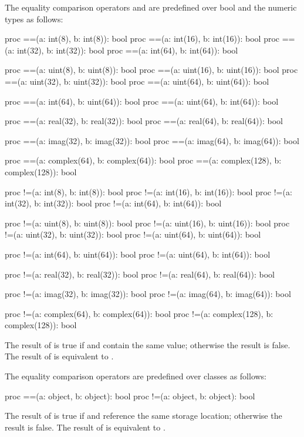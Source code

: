 The equality comparison operators \chpl{==} and \chpl{\!=} are predefined over bool and the
numeric types as follows:
\begin{chapel}
proc ==(a: int(8), b: int(8)): bool
proc ==(a: int(16), b: int(16)): bool
proc ==(a: int(32), b: int(32)): bool
proc ==(a: int(64), b: int(64)): bool

proc ==(a: uint(8), b: uint(8)): bool
proc ==(a: uint(16), b: uint(16)): bool
proc ==(a: uint(32), b: uint(32)): bool
proc ==(a: uint(64), b: uint(64)): bool

proc ==(a: int(64), b: uint(64)): bool
proc ==(a: uint(64), b: int(64)): bool

proc ==(a: real(32), b: real(32)): bool
proc ==(a: real(64), b: real(64)): bool

proc ==(a: imag(32), b: imag(32)): bool
proc ==(a: imag(64), b: imag(64)): bool

proc ==(a: complex(64), b: complex(64)): bool
proc ==(a: complex(128), b: complex(128)): bool

proc !=(a: int(8), b: int(8)): bool
proc !=(a: int(16), b: int(16)): bool
proc !=(a: int(32), b: int(32)): bool
proc !=(a: int(64), b: int(64)): bool

proc !=(a: uint(8), b: uint(8)): bool
proc !=(a: uint(16), b: uint(16)): bool
proc !=(a: uint(32), b: uint(32)): bool
proc !=(a: uint(64), b: uint(64)): bool

proc !=(a: int(64), b: uint(64)): bool
proc !=(a: uint(64), b: int(64)): bool

proc !=(a: real(32), b: real(32)): bool
proc !=(a: real(64), b: real(64)): bool

proc !=(a: imag(32), b: imag(32)): bool
proc !=(a: imag(64), b: imag(64)): bool

proc !=(a: complex(64), b: complex(64)): bool
proc !=(a: complex(128), b: complex(128)): bool
\end{chapel}
The result of  is true if  and  contain
the same value; otherwise the result is false.  The result of  is equivalent to .

The equality comparison operators are predefined over classes as
follows:
\begin{chapel}
proc ==(a: object, b: object): bool
proc !=(a: object, b: object): bool
\end{chapel}
The result of  is true if  and  reference
the same storage location; otherwise the result is false.  The result
of  is equivalent to .

